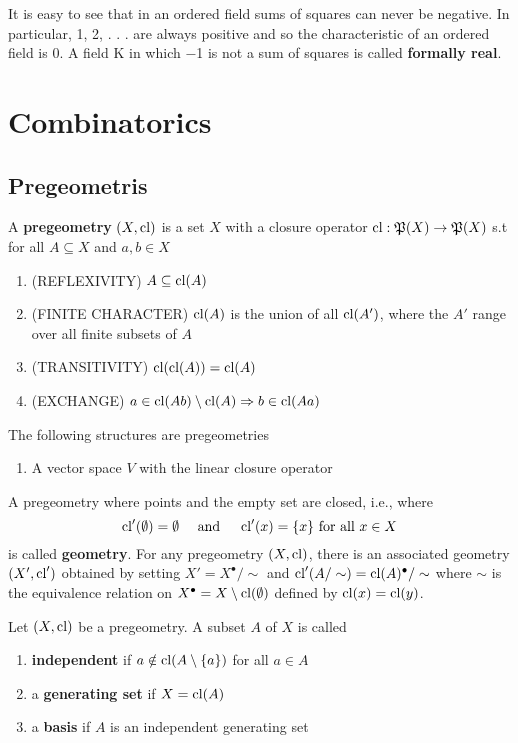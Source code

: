 \documentclass[11pt]{article}
\begin{document}
It is easy to see that in an ordered field sums of squares can never be negative. In particular,
1, 2, . . . are always positive and so the characteristic of an ordered field is 0. A field K in
which −1 is not a sum of squares is called \textbf{formally real}.
\section{Combinatorics}
\label{sec:orgc4d6164}
\subsection{Pregeometris}
\label{sec:org7851af2}
\begin{definition}[]
A \textbf{pregeometry} \((X,\operatorname{\text{cl}})\) is a set \(X\) with a closure operator \(\operatorname{\text{cl}}:\mathfrak{P}(X)\to\mathfrak{P}(X)\) s.t for
all \(A\subseteq X\) and \(a,b\in X\)
\begin{enumerate}
\item (REFLEXIVITY) \(A\subseteq\operatorname{\text{cl}}(A)\)
\item (FINITE CHARACTER) \(\operatorname{\text{cl}}(A)\) is the union of all \(\operatorname{\text{cl}}(A')\), where the \(A'\) range over
all finite subsets of \(A\)
\item (TRANSITIVITY) \(\operatorname{\text{cl}}(\operatorname{\text{cl}}(A))=\operatorname{\text{cl}}(A)\)
\item (EXCHANGE) \(a\in\operatorname{\text{cl}}(Ab)\setminus\operatorname{\text{cl}}(A)\Rightarrow b\in\operatorname{\text{cl}}(Aa)\)
\end{enumerate}
\end{definition}

\begin{remark}
The following structures are pregeometries
\begin{enumerate}
\item A vector space \(V\) with the linear closure operator
\end{enumerate}
\end{remark}

A pregeometry where points and the empty set are closed, i.e., where
\begin{equation*}
\operatorname{\text{cl}}'(\emptyset)=\emptyset \quad\text{ and }\quad
\operatorname{\text{cl}}'(x)=\{x\}\text{ for all }x\in X
\end{equation*}
is called \textbf{geometry}. For any pregeometry \((X,\operatorname{\text{cl}})\), there is an associated
geometry \((X',\operatorname{\text{cl}}')\) obtained by setting \(X'=X^\bullet/\sim\) and \(\operatorname{\text{cl}}'(A/\sim) =\operatorname{\text{cl}}(A)^\bullet/\sim\)
where \(\sim\) is the equivalence relation on \(X^\bullet=X\setminus\operatorname{\text{cl}}(\emptyset)\) defined by \(\operatorname{\text{cl}}(x) =\operatorname{\text{cl}}(y)\).

\begin{definition}[]
Let \((X,\operatorname{\text{cl}})\) be a pregeometry. A subset \(A\) of \(X\) is called
\begin{enumerate}
\item \textbf{independent} if \(a\notin\operatorname{\text{cl}}(A\setminus\{a\})\) for all \(a\in A\)
\item a \textbf{generating set} if \(X=\operatorname{\text{cl}}(A)\)
\item a \textbf{basis} if \(A\) is an independent generating set
\end{enumerate}
\end{definition}
\end{document}
